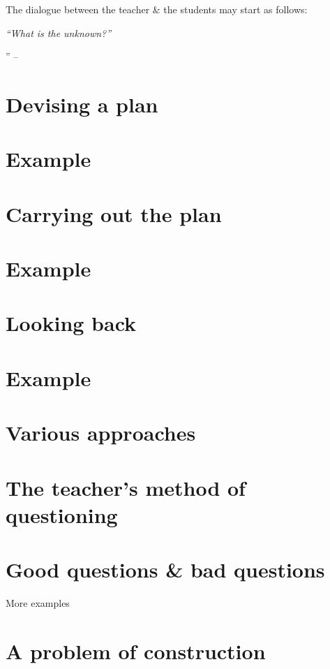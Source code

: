 \documentclass[oneside]{book}
\numberwithin{equation}{section}
\begin{document}
The dialogue between the teacher \& the students may start as follows:

\textit{``What is the unknown?''}

'' -- \cite[pp. 7--8]{Polya2014}

\section{Devising a plan}

\section{Example}

\section{Carrying out the plan}

\section{Example}

\section{Looking back}

\section{Example}

\section{Various approaches}

\section{The teacher's method of questioning}

\section{Good questions \& bad questions}

\begin{center}
	\LARGE More examples
\end{center}

\section{A problem of construction}
\end{document}
